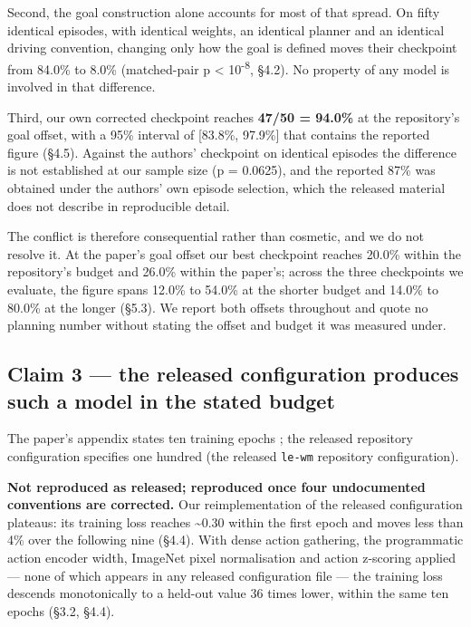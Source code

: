 \documentclass[10pt]{article}
\newcounter{none}
\begin{document}
Second, the goal construction alone accounts for most of that spread. On fifty
identical episodes, with identical weights, an identical planner and an
identical driving convention, changing only how the goal is defined moves their
checkpoint from 84.0\% to 8.0\% (matched-pair p \textless{} 10\textsuperscript{-8}, \S{}4.2). No property of any
model is involved in that difference.

Third, our own corrected checkpoint reaches \textbf{47/50 = 94.0\%} at the
repository's goal offset, with a 95\% interval of {[}83.8\%, 97.9\%{]} that contains
the reported figure (\S{}4.5). Against the authors' checkpoint on identical
episodes the difference is not established at our sample size (p = 0.0625), and
the reported 87\% was obtained under the authors' own episode selection, which
the released material does not describe in reproducible detail.

The conflict is therefore consequential rather than cosmetic, and we do not
resolve it. At the paper's goal offset our best checkpoint reaches 20.0\% within
the repository's budget and 26.0\% within the paper's; across the three
checkpoints we evaluate, the figure spans 12.0\% to 54.0\% at the shorter budget
and 14.0\% to 80.0\% at the longer (\S{}5.3). We report both offsets throughout and
quote no planning number without stating the offset and budget it was measured
under.

\subsection{Claim 3 --- the released configuration produces such a model in the stated budget}\label{claim-3-the-released-configuration-produces-such-a-model-in-the-stated-budget}

\medskip\noindent
The paper's appendix states ten training epochs \citep[App.~E]{maes2026lewm}; the released
repository configuration specifies one hundred (the released \texttt{le-wm} repository configuration).
\medskip

\textbf{Not reproduced as released; reproduced once four undocumented conventions are
corrected.} Our reimplementation of the released configuration plateaus: its
training loss reaches \textasciitilde0.30 within the first epoch and moves less than 4\% over
the following nine (\S{}4.4). With dense action gathering, the programmatic action
encoder width, ImageNet pixel normalisation and action z-scoring applied --- none
of which appears in any released configuration file --- the training loss descends
monotonically to a held-out value 36 times lower, within the same ten epochs
(\S{}3.2, \S{}4.4).
\end{document}
